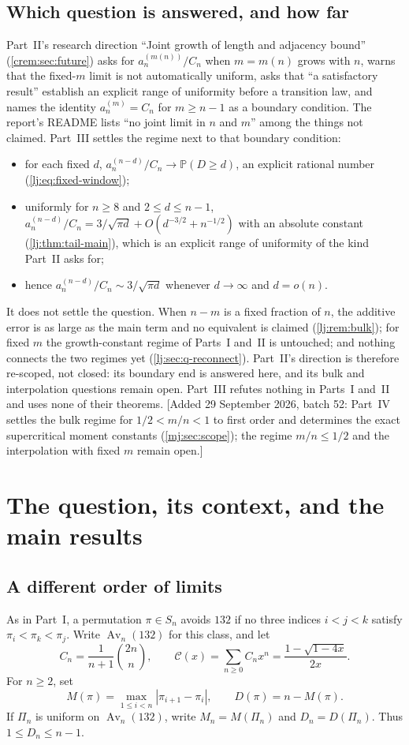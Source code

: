\documentclass[11pt,a4paper]{article}
\theoremstyle{definition}\newaliascnt{definition}{theorem}
\theoremstyle{remark}\newaliascnt{remark}{theorem}
\newcommand{\Av}{\operatorname{Av}}
\newcommand{\Cat}{\mathcal C}
\newcommand{\ljP}{\mathbb P}
\begin{document}
\subsection{Which question is answered, and how far}
\label{lj:sec:scope}
Part~II's research direction ``Joint growth of length and adjacency bound''
(\cref{crem:sec:future}) asks for $a_n^{(m(n))}/C_n$ when $m=m(n)$ grows
with $n$, warns that the fixed-$m$ limit is not automatically uniform, asks
that ``a satisfactory result'' establish an explicit range of uniformity
before a transition law, and names the identity $a_n^{(m)}=C_n$ for $m\ge
n-1$ as a boundary condition. The report's README lists ``no joint limit in
$n$ and $m$'' among the things not claimed. Part~III settles the regime next
to that boundary condition:
\begin{itemize}
\item for each fixed $d$, $a_n^{(n-d)}/C_n\to\ljP(D\ge d)$, an explicit
 rational number (\cref{lj:eq:fixed-window});
\item uniformly for $n\ge8$ and $2\le d\le n-1$,
 $a_n^{(n-d)}/C_n=3/\sqrt{\pi d}+O(d^{-3/2}+n^{-1/2})$ with an absolute
 constant (\cref{lj:thm:tail-main}), which is an explicit range of
 uniformity of the kind Part~II asks for;
\item hence $a_n^{(n-d)}/C_n\sim3/\sqrt{\pi d}$ whenever $d\to\infty$ and
 $d=o(n)$.
\end{itemize}
It does not settle the question. When $n-m$ is a fixed fraction of $n$, the
additive error is as large as the main term and no equivalent is claimed
(\cref{lj:rem:bulk}); for fixed $m$ the growth-constant regime of Parts~I
and~II is untouched; and nothing connects the two regimes yet
(\cref{lj:sec:q-reconnect}). Part~II's direction is therefore re-scoped, not
closed: its boundary end is answered here, and its bulk and interpolation
questions remain open. Part~III refutes nothing in Parts~I and~II and uses
none of their theorems.
[Added 29 September 2026, batch 52: Part~IV settles the bulk regime for
$1/2<m/n<1$ to first order and determines the exact supercritical moment
constants (\cref{mj:sec:scope}); the regime $m/n\le1/2$ and the interpolation
with fixed $m$ remain open.]

\section{The question, its context, and the main results}
\label{lj:sec:introduction}

\subsection{A different order of limits}
As in Part~I, a permutation $\pi\in S_n$ avoids $132$ if no three indices
$i<j<k$ satisfy $\pi_i<\pi_k<\pi_j$. Write $\Av_n(132)$ for this class, and let
\[
 C_n=\frac1{n+1}\binom{2n}{n},\qquad
 \Cat(x)=\sum_{n\ge0}C_nx^n=\frac{1-\sqrt{1-4x}}{2x}.
\]
For $n\ge2$, set
\begin{equation}
 M(\pi)=\max_{1\le i<n}|\pi_{i+1}-\pi_i|,
 \qquad D(\pi)=n-M(\pi).
 \label{lj:eq:statistics}
\end{equation}
If $\Pi_n$ is uniform on $\Av_n(132)$, write $M_n=M(\Pi_n)$ and
$D_n=D(\Pi_n)$. Thus $1\le D_n\le n-1$.
\end{document}
